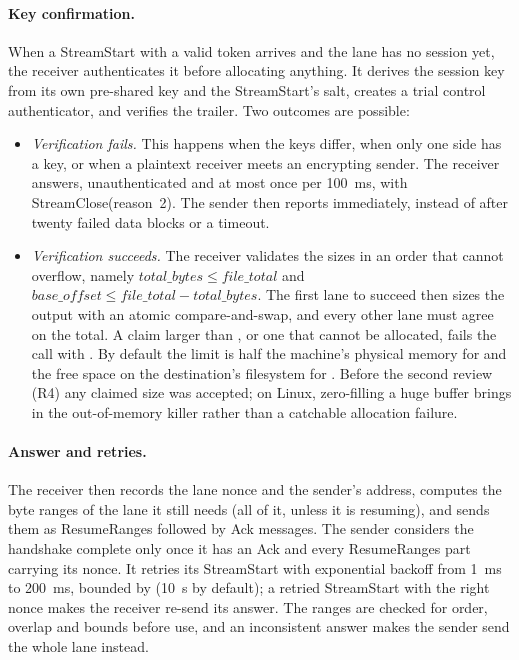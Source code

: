 \paragraph{Key confirmation\vviii.} When a StreamStart with a valid token arrives and the lane has no session
yet, the receiver authenticates it before allocating anything. It derives the session key from its own
pre-shared key and the StreamStart's salt, creates a trial control authenticator, and verifies the trailer. Two
outcomes are possible:
\begin{itemize}
  \item \emph{Verification fails.} This happens when the keys differ, when only one side has a key, or when a
    plaintext receiver meets an encrypting sender. The receiver answers, unauthenticated and at most once per
    100~ms, with StreamClose(reason~2). The sender then reports  immediately, instead of after
    twenty failed data blocks or a timeout.
  \item \emph{Verification succeeds.} The receiver validates the sizes in an order that cannot overflow, namely
    $\mathit{total\_bytes}\le\mathit{file\_total}$ and
    $\mathit{base\_offset}\le\mathit{file\_total}-\mathit{total\_bytes}$. The first lane to succeed then sizes
    the output with an atomic compare-and-swap, and every other lane must agree on the total. A claim larger
    than , or one that cannot be allocated, fails the call with
    . By default the limit is half the machine's physical memory for
     and the free space on the destination's filesystem for . Before
    the second review (R4) any claimed size was accepted; on Linux, zero-filling a huge buffer brings in the
    out-of-memory killer rather than a catchable allocation failure.
\end{itemize}

\paragraph{Answer and retries.} The receiver then records the lane nonce and the sender's address, computes the
byte ranges of the lane it still needs (all of it, unless it is resuming), and sends them as ResumeRanges
followed by Ack messages. The sender considers the handshake complete only once it has an Ack and every
ResumeRanges part carrying its nonce. It retries its StreamStart with exponential backoff from 1~ms to 200~ms,
bounded by  (10~s by default); a retried StreamStart with the right nonce makes the
receiver re-send its answer. The ranges are checked for order, overlap and bounds before use, and an
inconsistent answer makes the sender send the whole lane instead.

